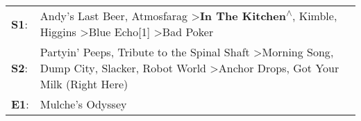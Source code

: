 \begin{supertabular}{p{0.03\textwidth}p{0.92\textwidth}}
 \textbf{S1}:  &                                              Andy's Last Beer\textsuperscript{}, \enspace Atmosfarag\textsuperscript{} \textgreater \enspace \textbf{In The Kitchen\textsuperscript{$\wedge$}}, \enspace Kimble\textsuperscript{}, \enspace Higgins\textsuperscript{} \textgreater \enspace Blue Echo[1]\textsuperscript{} \textgreater \enspace Bad Poker\textsuperscript{}  \enspace  \\
 \textbf{S2}:  &  Partyin' Peeps\textsuperscript{}, \enspace Tribute to the Spinal Shaft\textsuperscript{} \textgreater \enspace Morning Song\textsuperscript{}, \enspace Dump City\textsuperscript{}, \enspace Slacker\textsuperscript{}, \enspace Robot World\textsuperscript{} \textgreater \enspace Anchor Drops\textsuperscript{}, \enspace Got Your Milk (Right Here)\textsuperscript{}  \enspace  \\
 \textbf{E1}:  &                                                                                                                                                                                                                                                                                                                                           Mulche's Odyssey\textsuperscript{}  \enspace  \\
\end{supertabular}

